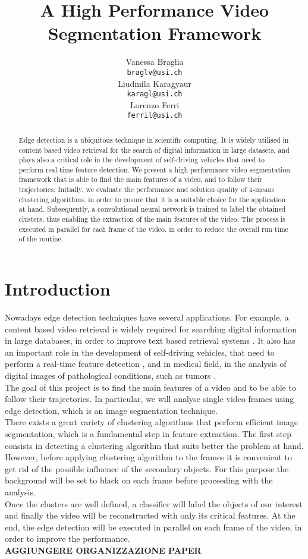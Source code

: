 \documentclass{article}
\title{A High Performance Video Segmentation Framework }
\author{
  Vanessa Braglia \\
  \texttt{braglv@usi.ch} \\
   \And
 Liudmila Karagyaur \\
  \texttt{karagl@usi.ch} \\
     \And
  Lorenzo Ferri \\
  \texttt{ferril@usi.ch} \\
}
\begin{document}
{\selectfont
\maketitle

\begin{abstract}
Edge detection is a ubiquitous technique in scientific computing. It is widely utilised in content based video retrieval for the search of digital information in large datasets, and plays also a critical role in the development of self-driving vehicles that need to perform real-time feature detection.
We present a high performance video segmentation framework that is able to find the main features of a video, and to follow their trajectories. Initially, we evaluate the performance and solution quality of k-means clustering algorithms, in order to ensure that it is a suitable choice for the application at hand. Subsequently, a convolutional neural network is trained to label the obtained clusters, thus enabling the extraction of the main features of the video. The process is executed in parallel for each frame of the video, in order to reduce the overall run time of the routine.
\end{abstract}



\large
\section{Introduction}

Nowadays edge detection techniques have several applications. For example, a content based video retrieval is widely required for searching digital information in large databases, in order to improve text based retrieval systems \cite{1}. It also has an important role in the development of self-driving vehicles, that need to perform a real-time feature detection \cite{2}, and in medical field, in the analysis of digital images of pathological conditions, such as tumors \cite{3}. \\
The goal of this project is to find the main features of a video and to be able to follow their trajectories. In particular, we will analyse single video frames using edge detection, which is an image segmentation technique. \\
There exists a great variety of clustering algorithms that perform efficient image segmentation, which is a fundamental step in feature extraction. The first step consists in detecting a clustering algorithm that suits better the problem at hand. 
However, before applying clustering algorithm to the frames it is convenient to get rid of the possible influence of the secondary objects. For this purpose the background will be set to black on each frame before proceeding with the analysis. \\
Once the clusters are well defined, a classifier will label the objects of our interest and finally the video will be reconstructed with only its critical features. At the end, the edge detection will be executed in parallel on each frame of the video, in order to improve the performance. \\
\textbf{AGGIUNGERE ORGANIZZAZIONE PAPER}
}
\end{document}

